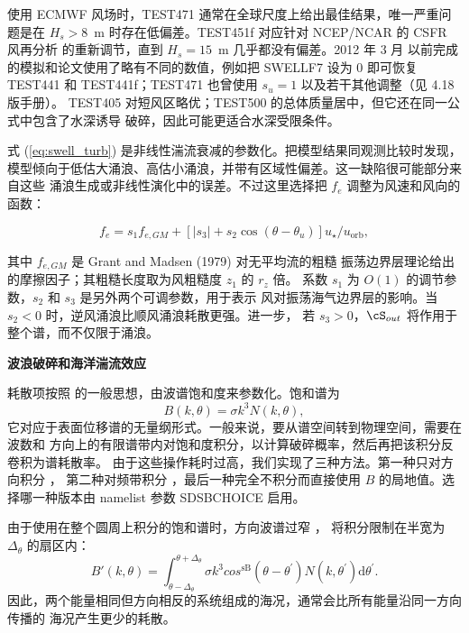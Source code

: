使用 ECMWF 风场时，TEST471 通常在全球尺度上给出最佳结果，唯一严重问题是在
$H_s > 8$~m 时存在低偏差。TEST451f 对应针对 NCEP/NCAR 的 CSFR 风再分析
\citep{art:CFSRR10} 的重新调节，直到 $H_s = 15$~m 几乎都没有偏差。2012 年 3 月
以前完成的模拟和论文使用了略有不同的数值，例如把 SWELLF7 设为 0 即可恢复
TEST441 和 TEST441f；TEST471 也曾使用 $s_u=1$ 以及若干其他调整（见 4.18 版手册）。
TEST405 对短风区略优；TEST500 的总体质量居中，但它还在同一公式中包含了水深诱导
破碎，因此可能更适合水深受限条件。

式 (\ref{eq:swell_turb}) 是非线性湍流衰减的参数化。把模型结果同观测比较时发现，
模型倾向于低估大涌浪、高估小涌浪，并带有区域性偏差。这一缺陷很可能部分来自这些
涌浪生成或非线性演化中的误差。不过这里选择把 $f_e$ 调整为风速和风向的函数：

\begin{equation}
f_e = s_1 f_{e,GM} + \left[\left|s_3\right| + s_2 \cos
(\theta-\theta_u)\right]u_\star / u_{\mathrm{orb}},\label{fevar}
\end{equation}

\noindent
其中 $f_{e,GM}$ 是 Grant and Madsen (1979)\nocite{art:GM79} 对无平均流的粗糙
振荡边界层理论给出的摩擦因子；其粗糙长度取为风粗糙度 $z_1$ 的 $r_z$ 倍。
系数 $s_1$ 为 $O(1)$ 的调节参数，$s_2$ 和 $s_3$ 是另外两个可调参数，用于表示
风对振荡海气边界层的影响。当 $s_2 < 0$ 时，逆风涌浪比顺风涌浪耗散更强。进一步，
若 $s_3 > 0$，$\cS_{out}$ 将作用于整个谱，而不仅限于涌浪。

\vsssub
\textbf{波浪破碎和海洋湍流效应}
\vsssub

耗散项按照 \cite{art:Phi85} 的一般思想，由波谱饱和度来参数化。饱和谱为
\begin{equation}
B\left(k,\theta\right)= \sigma k^3  N(k,\theta) \label{defB},
\end{equation}
它对应于表面位移谱的无量纲形式。一般来说，要从谱空间转到物理空间，需要在波数和
方向上的有限谱带内对饱和度积分，以计算破碎概率，然后再把该积分反卷积为谱耗散率。
由于这些操作耗时过高，我们实现了三种方法。第一种只对方向积分 \citep{art:Aea10}，
第二种对频带积分 \citep{Filipot&Ardhuin2012}，最后一种完全不积分而直接使用
$B$ 的局地值。选择哪一种版本由 namelist 参数 {\F SDSBCHOICE} 启用。

由于使用在整个圆周上积分的饱和谱时，方向波谱过窄 \citep{art:AL06}，
\citet{art:Aea10} 将积分限制在半宽为 $\Delta_\theta$ 的扇区内：
\begin{equation}
B'\left(k,\theta\right)=
\int_{\theta-\Delta_\theta}^{\theta+\Delta_\theta} \sigma k^3 cos^{\mathrm{sB}}\left(\theta-
\theta^{\prime}\right) N(k,\theta^{\prime}) \mathrm d
\theta^{\prime} \label{defBofkprime}.
\end{equation}
因此，两个能量相同但方向相反的系统组成的海况，通常会比所有能量沿同一方向传播的
海况产生更少的耗散。

